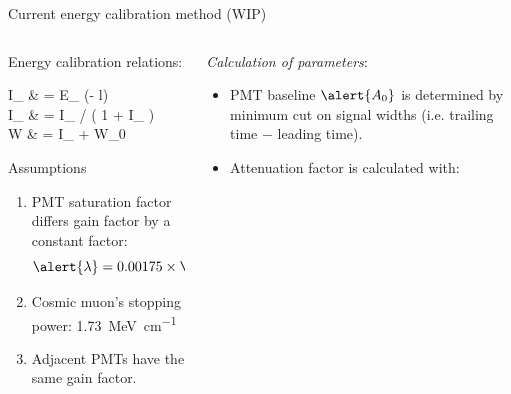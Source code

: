 \documentclass{ikpKoeln}
\begin{document}
\begin{frame}[t]{Current energy calibration method (WIP)}
	\vspace{-1em}
	\begin{columns}[t]
		\begin{column}{0.45 \textwidth}
			\vspace{-1em}
			\begin{alertblock}{\small Energy calibration relations:}
				\footnotesize{
					\setlength{\abovedisplayskip}{0pt}
					\setlength{\belowdisplayskip}{0pt}
					\setlength{\abovedisplayshortskip}{0pt}
					\setlength{\belowdisplayshortskip}{0pt}
					\begin{flalign*}
						I_ & = E_ \cdot \exp(-\alert{\alpha} \cdot l)                           \\
						I_ & = I_ \cdot / \left( 1 + \alert{\lambda} \cdot I_ \right) \\
						W            & = \alert{} \cdot I_ + \alert{W_0}
					\end{flalign*}
				}
			\end{alertblock}
			\begin{exampleblock}{\small Assumptions}
				\footnotesize{
					\begin{enumerate}
						\setlength\itemsep{0em}
						\item PMT saturation factor differs gain factor by a constant factor: \vspace{-1em}$$\alert{\lambda} = 0.00175 \times \alert{\mathcal{G}}$$
						\item \vspace{-1em}Cosmic muon's stopping power: \qty{1.73}{\mega\electronvolt\per\centi\metre}
						\item Adjacent PMTs have the same gain factor.
					\end{enumerate}
				}
			\end{exampleblock}
		\end{column}
		\begin{column}{0.45 \textwidth}
			\textit{\footnotesize Calculation of parameters}:
			\small{
				\begin{itemize}
					\setlength\itemsep{0em}
					\item PMT baseline $\alert{A_0}$ is determined by minimum cut on signal widths (i.e. trailing time $-$ leading time).
					\item Attenuation factor is calculated with:

\end{itemize}}
\end{column}
\end{columns}
\end{frame}
\end{document}
